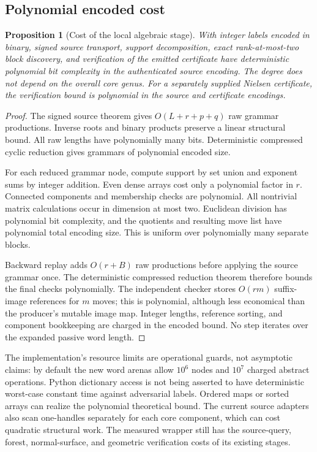 \documentclass[11pt,a4paper]{article}
\newtheorem{proposition}[theorem]{Proposition}
\theoremstyle{definition}
\theoremstyle{remark}
\begin{document}
\subsection{Polynomial encoded cost}

\begin{proposition}[Cost of the local algebraic stage]
\label{prop:cost}
With integer labels encoded in binary, signed source transport, support
decomposition, exact rank-at-most-two block discovery, and verification of
the emitted certificate have deterministic polynomial bit complexity in
the authenticated source encoding. The degree does not depend on the
overall core genus. For a separately supplied Nielsen certificate, the
verification bound is polynomial in the source and certificate encodings.
\end{proposition}

\begin{proof}
The signed source theorem gives $O(L+r+p+q)$ raw grammar productions.
Inverse roots and binary products preserve a linear structural bound.
All raw lengths have polynomially many bits. Deterministic compressed
cyclic reduction gives grammars of polynomial encoded size.

For each reduced grammar node, compute support by set union and exponent
sums by integer addition. Even dense arrays cost only a polynomial factor
in $r$. Connected components and membership checks are polynomial. All
nontrivial matrix calculations occur in dimension at most two. Euclidean
division has polynomial bit complexity, and the quotients and resulting
move list have polynomial total encoding size. This is uniform over
polynomially many separate blocks.

Backward replay adds $O(r+B)$ raw productions before applying the source
grammar once. The deterministic compressed reduction theorem therefore
bounds the final checks polynomially. The independent checker stores
$O(rm)$ suffix-image references for $m$ moves; this is polynomial, although
less economical than the producer's mutable image map. Integer lengths,
reference sorting, and component bookkeeping are charged in the encoded
bound. No step iterates over the expanded passive word length.
\end{proof}

The implementation's resource limits are operational guards, not asymptotic
claims: by default the new word arenas allow $10^6$ nodes and $10^7$
charged abstract operations. Python dictionary access is not being asserted
to have deterministic worst-case constant time against adversarial labels.
Ordered maps or sorted arrays can realize the polynomial theoretical
bound. The current source adapters also scan one-handles separately for
each core component, which can cost quadratic structural work. The
measured wrapper still has the source-query, forest,
normal-surface, and geometric verification costs of its existing stages.
\end{document}
